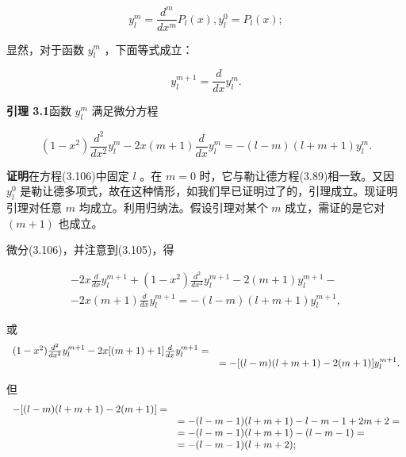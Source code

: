 \begin{equation*}
y _ {l} ^ {m} = \frac {d ^ {m}}{d x ^ {m}} P _ {l} (x), y _ {l} ^ {0} = P _ {l} (x);
\end{equation*}

显然，对于函数 $y_{l}^{m}$ ，下面等式成立：

\begin{equation*}
y _ {l} ^ {m + 1} = \frac {d}{d x} y _ {l} ^ {m}.\tag{3.105}
\end{equation*}

\textbf{引理 3.1}\quad 函数 $y_{l}^{m}$ 满足微分方程

\begin{equation*}
(1 - x ^ {2}) \frac {d ^ {2}}{d x ^ {2}} y _ {l} ^ {m} - 2 x (m + 1) \frac {d}{d x} y _ {l} ^ {m} = - (l - m) (l + m + 1) y _ {l} ^ {m}.\tag{3.106}
\end{equation*}

\textbf{证明}\quad 在方程(3.106)中固定 $l$ 。在 $m = 0$ 时，它与勒让德方程(3.89)相一致。又因 $y_{l}^{0}$ 是勒让德多项式，故在这种情形，如我们早已证明过了的，引理成立。现证明引理对任意 $m$ 均成立。利用归纳法。假设引理对某个 $m$ 成立，需证的是它对 $(m + 1)$ 也成立。

微分(3.106)，并注意到(3.105)，得

\begin{equation*}
\begin{array}{l} - 2 x \frac {d}{d x} y _ {l} ^ {m + 1} + (1 - x ^ {2}) \frac {d ^ {2}}{d x ^ {2}} y _ {l} ^ {m + 1} - 2 (m + 1) y _ {l} ^ {m + 1} - \\ - 2 x (m + 1) \frac {d}{d x} y _ {l} ^ {m + 1} = - (l - m) (l + m + 1) y _ {l} ^ {m + 1}, \end{array}
\end{equation*}

或
\begin{equation*}
\begin{array}{r l}
(1 - x ^ {2}) \frac {d ^ {2}}{d x ^ {2}} y _ {l} ^ {m + 1} - 2 x [ (m + 1) + 1 ] \frac {d}{d x} y _ {l} ^ {m + 1} = \\
 & = - [ (l - m) (l + m + 1) - 2 (m + 1) ] y _ {l} ^ {m + 1}.
\end{array}
\end{equation*}

但
\begin{equation*}
\begin{array}{r l}
- [ (l - m) (l + m + 1) - 2 (m + 1) ] = \\
 & = - (l - m - 1) (l + m + 1) - l - m - 1 + 2 m + 2 = \\
 & = - (l - m - 1) (l + m + 1) - (l - m - 1) = \\
 & = - (l - m - 1) (l + m + 2);
\end{array}
\end{equation*}

